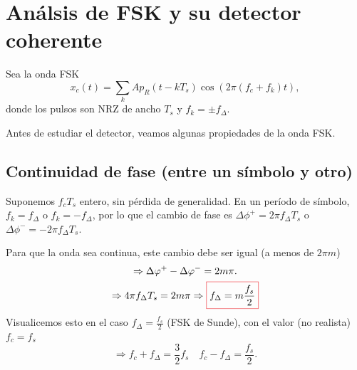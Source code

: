 \section{Análsis de FSK y su detector coherente}

Sea la onda FSK
\[ x_c(t)=\sum_k A p_R(t-kT_s)\cos\left(2\pi(f_c+f_k)t\right),\]
donde los pulsos son NRZ de ancho $T_s$ y $f_k=\pm f_\Delta$.

Antes de estudiar el detector, veamos algunas propiedades de la
onda FSK.

\subsection*{Continuidad de fase (entre un símbolo y otro)}

Suponemos $f_c T_s$ entero, sin pérdida de generalidad.
En un período de símbolo, $f_k=f_\Delta$ o $f_k=-f_\Delta$, por lo que el cambio de fase es $\Delta\phi^+=2\pi f_\Delta T_s$ o $\Delta\phi^-=-2\pi f_\Delta T_s$.

Para que la onda sea continua, este cambio debe ser igual (a menos de $2\pi m$)
    \begin{gather*}
        \Rightarrow \Delta\phi^+ - \Delta\phi^- = 2m\pi.\\
        \Rightarrow 4 \pi f_\Delta T_s = 2 m \pi \Rightarrow \col{f_\Delta = m \frac{f_s}{2}}
    \end{gather*}
    Visualicemos esto en el caso $f_\Delta=\frac{f_s}{2}$ (FSK de Sunde), con el valor (no
    realista) $f_c=f_s$
    \[\Rightarrow  f_c + f_\Delta = \frac{3}{2}f_s \quad f_c - f_{\Delta} =
    \frac{f_s}{2}.\]

        \begin{center}\begin{minipage}{\textwidth}
        \endpgfgraphicnamed\end{minipage}
        \end{center}

